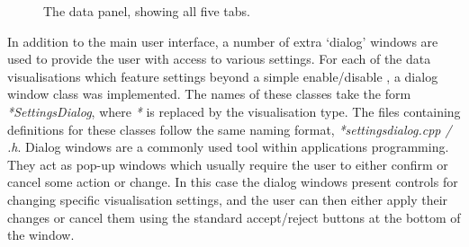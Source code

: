 \begin{figure}
 \centering
 \decoRule
 \caption[Data Panel]{The data panel, showing all five tabs.}
 \label{fig:DataPanel}
\end{figure}

In addition to the main user interface, a number of extra `dialog' windows are used to provide the user with access to various settings. For each of the data visualisations which feature settings beyond a simple enable/disable , a dialog window class was implemented. The names of these classes take the form \textit{*SettingsDialog}, where \textit{*} is replaced by the visualisation type. The files containing definitions for these classes follow the same naming format, \textit{*settingsdialog.cpp / .h}. Dialog windows are a commonly used tool within applications programming. They act as pop-up windows which usually require the user to either confirm or cancel some action or change. In this case the dialog windows present controls for changing specific visualisation settings, and the user can then either apply their changes or cancel them using the standard accept/reject buttons at the bottom of the window.

